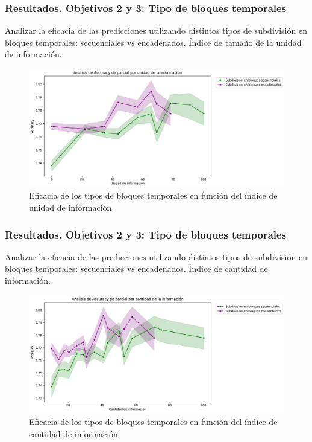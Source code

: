\documentclass{beamer}
\begin{document}
\begin{frame}
	\frametitle{Resultados. Objetivos 2 y 3: Tipo de bloques temporales}
\begin{block}{Analizar la eficacia de las predicciones utilizando
		distintos tipos de subdivisión en bloques temporales: secuenciales vs encadenados.}
		Índice de tamaño de la unidad de información.
	\end{block}
	
\begin{figure}[H]
	\centering
	\includegraphics[width=0.7\linewidth]{figs/cap7/figura_16}
	\caption{Eficacia de los tipos de bloques temporales en función del índice de unidad de información}
	
	\label{fig:figura213}
\end{figure}

	
\end{frame}


\begin{frame}
	\frametitle{Resultados. Objetivos 2 y 3: Tipo de bloques temporales}
\begin{block}{Analizar la eficacia de las predicciones utilizando
		distintos tipos de subdivisión en bloques temporales: secuenciales vs encadenados.}
		Índice de cantidad de información.
	\end{block}
	

\begin{figure}[H]
	\centering
	\includegraphics[width=0.7\linewidth]{figs/cap7/figura_17}
	\caption{Eficacia de los tipos de bloques temporales en función del índice de cantidad de información}
	\label{fig:figura214}
\end{figure}
	
\end{frame}
\end{document}
